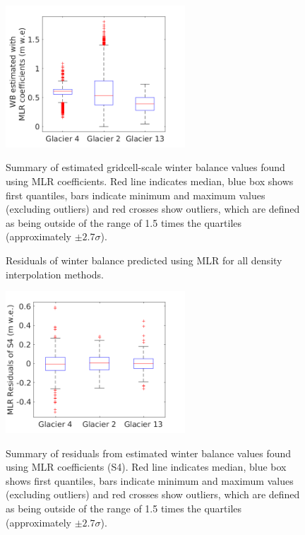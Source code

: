 \documentclass{sfuthesis}
\newcommand{\boxMatlab}{Red line indicates median, blue box shows first quantiles, bars indicate minimum and maximum values (excluding outliers) and red crosses show outliers, which are defined as being outside of the range of 1.5 times the quartiles (approximately $\pm2.7\sigma$). }
\begin{document}
\begin{figure}
\centering
	\includegraphics[width =0.6\textwidth]{ModelledSWE_box_MLR.png}\\
\caption{Summary of estimated gridcell-scale winter balance values found using MLR coefficients. \boxMatlab}
\label{fig:MLRsweboxplot}
\end{figure} 


\begin{figure}
	\caption{Residuals of winter balance predicted using MLR for all density interpolation methods.}
	\label{fig:MLRresiduals_all}
\end{figure}

\begin{figure}
\centering
	\includegraphics[width =0.6\textwidth]{residuals_box_MLR.png}\\
\caption{Summary of residuals from estimated winter balance values found using MLR coefficients (S4). \boxMatlab}
\label{fig:MLRresidualsboxplot}
\end{figure} 
\end{document}
